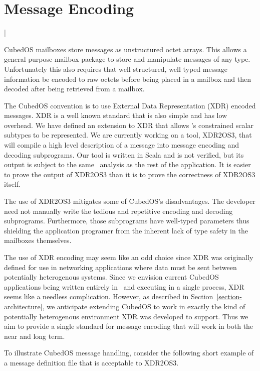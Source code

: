 
\section{Message Encoding}
\label{section-message-encoding}

\lstMakeShortInline|

CubedOS mailboxes store messages as unstructured octet arrays. This allows a general purpose
mailbox package to store and manipulate messages of any type. Unfortunately this also requires
that well structured, well typed message information be encoded to raw octets before being
placed in a mailbox and then decoded after being retrieved from a mailbox.

The CubedOS convention is to use External Data Representation (XDR) encoded messages. XDR is a
well known standard \cite{rfc-4506} that is also simple and has low overhead. We have defined an
extension to XDR that allows \SPARK's constrained scalar subtypes to be represented. We are
currently working on a tool, XDR2OS3, that will compile a high level description of a message
into message encoding and decoding subprograms. Our tool is written in Scala and is not
verified, but its output is subject to the same \SPARK\ analysis as the rest of the application.
It is easier to prove the output of XDR2OS3 than it is to prove the correctness of XDR2OS3
itself.

The use of XDR2OS3 mitigates some of CubedOS's disadvantages. The developer need not manually
write the tedious and repetitive encoding and decoding subprograms. Furthermore, those
subprograms have well-typed parameters thus shielding the application programer from the
inherent lack of type safety in the mailboxes themselves.

The use of XDR encoding may seem like an odd choice since XDR was originally defined for use in
networking applications where data must be sent between potentially heterogenous systems. Since
we envision current CubedOS applications being written entirely in \SPARK\ and executing in a
single process, XDR seems like a needless complication. However, as described in
Section~\ref{section-architecture}, we anticipate extending CubedOS to work in exactly the kind
of potentially heterogenous environment XDR was developed to support. Thus we aim to provide a
single standard for message encoding that will work in both the near and long term.

To illustrate CubedOS message handling, consider the following short example of a message
definition file that is acceptable to XDR2OS3.

